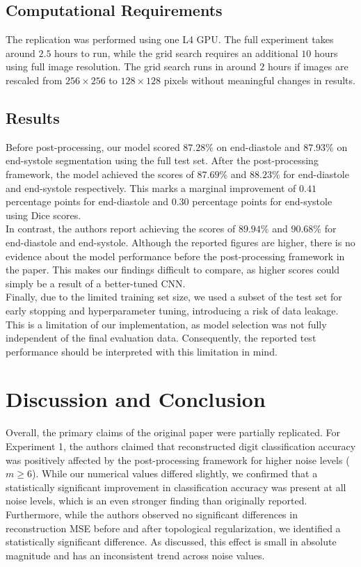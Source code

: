 \subsection{Computational Requirements}

The replication was performed using one L4 GPU. The full experiment takes around $2.5$ hours to run, while the grid search requires an additional $10$ hours using full image resolution. The grid search runs in around $2$ hours if images are rescaled from $256 \times 256$ to $128 \times 128$ pixels without meaningful changes in results.


\subsection{Results}

Before post-processing, our model scored $87.28\%$ on end-diastole and $87.93\%$ on end-systole segmentation using the full test set. After the post-processing framework, the model achieved the scores of $87.69\%$ and $88.23\%$ for end-diastole and end-systole respectively. This marks a marginal improvement of $0.41$ percentage points for end-diastole and $0.30$ percentage points for end-systole using Dice scores. \\

In contrast, the authors report achieving the scores of $89.94\%$ and $90.68\%$ for end-diastole and end-systole. Although the reported figures are higher, there is no evidence about the model performance before the post-processing framework in the paper. This makes our findings difficult to compare, as higher scores could simply be a result of a better-tuned CNN. \\

Finally, due to the limited training set size, we used a subset of the test set for early stopping and hyperparameter tuning, introducing a risk of data leakage. This is a limitation of our implementation, as model selection was not fully independent of the final evaluation data. Consequently, the reported test performance should be interpreted with this limitation in mind.


\section{Discussion and Conclusion}

Overall, the primary claims of the original paper were partially replicated. For Experiment 1, the authors claimed that reconstructed digit classification accuracy was positively affected by the post-processing framework for higher noise levels ($m \geq 6$). While our numerical values differed slightly, we confirmed that a statistically significant improvement in classification accuracy was present at all noise levels, which is an even stronger finding than originally reported. Furthermore, while the authors observed no significant differences in reconstruction MSE before and after topological regularization, we identified a statistically significant difference. As discussed, this effect is small in absolute magnitude and has an inconsistent trend across noise values. \\

